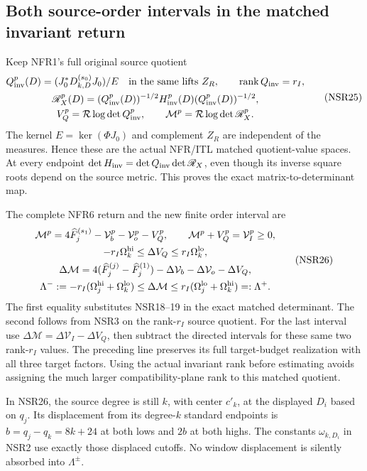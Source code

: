 \documentclass[11pt,a4paper]{article}
\begin{document}
\subsection{Both source-order intervals in the matched invariant return}
Keep NFR1's full original source quotient
\[
 \begin{gathered}
 Q_{\rm inv}^p(D)
       =(J_0^*D_{k,D}^{(s_0)}J_0)/E
          \quad\hbox{in the same lifts }Z_R,\qquad
 \operatorname{rank}Q_{\rm inv}=r_I,\\
 \mathscr R_X^p(D)
    =(Q_{\rm inv}^p(D))^{-1/2}H_{\rm inv}^p(D)
                         (Q_{\rm inv}^p(D))^{-1/2},\\
 V_Q^p=\mathcal R\log\det Q_{\rm inv}^p,\qquad
 \mathcal M^p=\mathcal R\log\det\mathscr R_X^p .
 \end{gathered}\tag{NSR25}
\]
The kernel $E=\ker(\Phi J_0)$ and complement $Z_R$ are
independent of the measures. Hence these are the actual
NFR/ITL matched quotient-value spaces. At every endpoint
$\det H_{\rm inv}=\det Q_{\rm inv}\det\mathscr R_X$,
even though its inverse square roots depend on the source
metric. This proves the exact matrix-to-determinant map.

The complete NFR6 return and the new finite order interval are
\[
 \begin{gathered}
 \mathcal M^p
  =4\widehat F_j^{(s_1)}-\mathcal V_b^p-\mathcal V_o^p-V_Q^p,
 \qquad \mathcal M^p+V_Q^p=\mathcal V_I^p\ge0,\\
 -r_I\Omega_k^{\rm hi}\le\Delta V_Q
                  \le r_I\Omega_k^{\rm lo},\\
 \Delta\mathcal M
  =4(\widehat F_j^{(j)}-\widehat F_j^{(1)})
                   -\Delta\mathcal V_b-\Delta\mathcal V_o-\Delta V_Q,\\
 \Lambda^-:=-r_I(\Omega_j^{\rm hi}+\Omega_k^{\rm lo})
       \le\Delta\mathcal M
       \le r_I(\Omega_j^{\rm lo}+\Omega_k^{\rm hi})=:\Lambda^+ .
 \end{gathered}\tag{NSR26}
\]
The first equality substitutes NSR18--19 in the exact
matched determinant. The second follows from NSR3 on
the rank-$r_I$ source quotient. For the last interval
use $\Delta\mathcal M=\Delta\mathcal V_I-\Delta V_Q$,
then subtract the directed intervals for these same two
rank-$r_I$ values. The preceding line preserves its full
target-budget realization with all three target factors.
Using the actual invariant rank before estimating avoids
assigning the much larger compatibility-plane rank to
this matched quotient.

In NSR26, the source degree is still $k$, with center
$c'_k$, at the displayed $D_i$ based on $q_j$.
Its displacement from its degree-$k$ standard endpoints is
$b=q_j-q_k=8k+24$ at both lows and $2b$ at both highs.
The constants $\omega_{k,D_i}$ in NSR2 use exactly
those displaced cutoffs. No window displacement is
silently absorbed into $\Lambda^\pm$.
\end{document}
